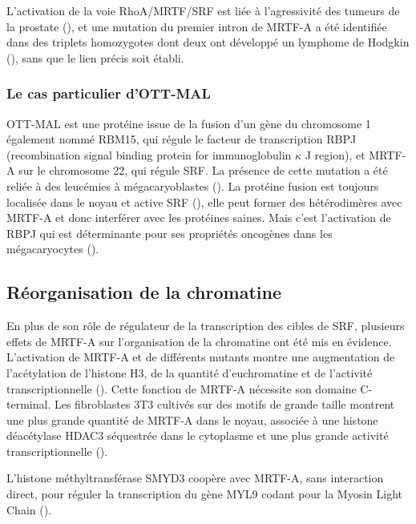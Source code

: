 \documentclass{report}
\begin{document}
L'activation de la voie RhoA/MRTF/SRF est liée à l'agressivité des tumeurs de la prostate (\cite{schmidt_rhoa_2012}), et une mutation du premier intron de MRTF-A a été identifiée dans des triplets homozygotes dont deux ont développé un lymphome de Hodgkin (\cite{bjorkholm_development_2013}), sans que le lien précis soit établi. 

\subsubsection{Le cas particulier d'OTT-MAL}

OTT-MAL est une protéine issue de la fusion d'un gène du chromosome 1 également nommé RBM15, qui régule le facteur de transcription RBPJ (recombination signal binding protein for immunoglobulin $\kappa$ J region), et MRTF-A sur le chromosome 22, qui régule SRF. La présence de cette mutation a été reliée à des leucémies à mégacaryoblastes (\cite{mercher_involvement_2001}). 
La protéine fusion est toujours localisée dans le noyau et active SRF (\cite{descot_ott-mal_2008}), elle peut former des hétérodimères avec MRTF-A et donc interférer avec les protéines saines. Mais c'est l'activation de RBPJ qui est déterminante pour ses propriétés oncogènes dans les mégacaryocytes (\cite{mercher_ott-mal_2009}). 

\subsection{Réorganisation de la chromatine}

En plus de son rôle de régulateur de la transcription des cibles de SRF, plusieurs effets de MRTF-A sur l'organisation de la chromatine ont été mis en évidence. L'activation de MRTF-A et de différents mutants montre une augmentation de l'acétylation de l'histone H3, de la quantité d'euchromatine et de l'activité transcriptionnelle (\cite{flouriot_actin/mkl1_2014}). Cette fonction de MRTF-A nécessite son domaine C-terminal. 
Les fibroblastes 3T3 cultivés sur des motifs de grande taille montrent une plus grande quantité de MRTF-A dans le noyau, associée à une histone déacétylase HDAC3 séquestrée dans le cytoplasme et une plus grande activité transcriptionnelle (\cite{jain_cell_2013}). 

L'histone méthyltransférase SMYD3 coopère avec MRTF-A, sans interaction direct, pour réguler la transcription du gène MYL9 codant pour la Myosin Light Chain (\cite{luo_histone_2014}). 


\newpage

\printbibliography
\end{document}
